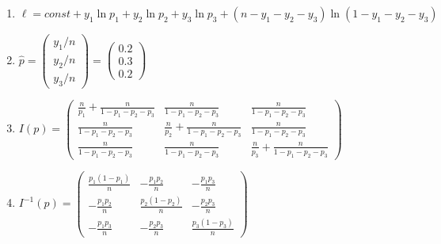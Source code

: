 \begin{problem}
\begin{sol}
\begin{enumerate}
\item $\ell = const + y_1 \ln p_1 + y_2 \ln p_2 + y_3 \ln p_3 + (n - y_1 - y_2 - y_3) \ln(1 - y_1 - y_2 - y_3)$
\item $\hat p = \begin{pmatrix} y_1 / n \\ y_2 / n \\ y_3 / n \end{pmatrix} = \begin{pmatrix} 0.2 \\ 0.3 \\ 0.2 \end{pmatrix}$
\item $I(p) = \begin{pmatrix}
\frac{n}{p_1} + \frac{n}{1-p_1-p_2-p_3} & \frac{n}{1-p_1-p_2-p_3} & \frac{n}{1-p_1-p_2-p_3} \\
\frac{n}{1-p_1-p_2-p_3} & \frac{n}{p_2} + \frac{n}{1-p_1-p_2-p_3} & \frac{n}{1-p_1-p_2-p_3} \\
\frac{n}{1-p_1-p_2-p_3} & \frac{n}{1-p_1-p_2-p_3} & \frac{n}{p_3} + \frac{n}{1-p_1-p_2-p_3}
\end{pmatrix}$
\item $I^{-1}(p) = \begin{pmatrix}
\frac{p_1(1-p_1)}{n} & -\frac{p_1 p_2}{n} & -\frac{p_1 p_3}{n} \\
-\frac{p_1 p_2}{n} & \frac{p_2(1-p_2)}{n} & -\frac{p_2 p_3}{n} \\
-\frac{p_1 p_3}{n} & -\frac{p_2 p_3}{n} & \frac{p_3(1-p_3)}{n}
\end{pmatrix}$
\end{enumerate}
\end{sol}
\end{problem}



